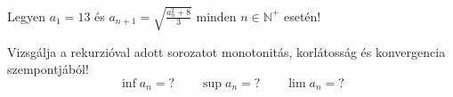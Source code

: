 \documentclass[11pt]{scrartcl}
\begin{document}
Legyen $a_1 = 13$ és \(\displaystyle a_{n + 1} = \sqrt{\frac{a_n^2 + 8}{3}}\)
minden $n \in \mathbb{N}^+$ esetén!

Vizsgálja a rekurzióval adott sorozatot monotonitás, korlátosság és
konvergencia szempontjából!
\[
	\inf a_n = ? \qquad \sup a_n = ? \qquad \lim a_n = ?
\]
\end{document}
